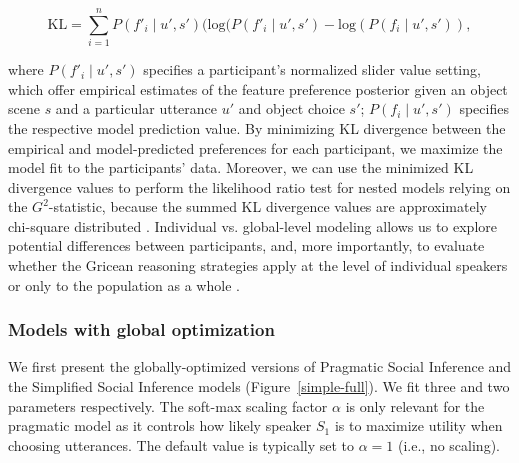 \documentclass[10pt,a4paper]{article}
\begin{document}
$$\textrm{KL} = \sum_{i=1}^{n} P(f'_i\mid u',s') (\textrm {log} (P(f'_i\mid u',s') - \textrm {log} (P(f_i\mid u',s')),$$

where $P(f'_i\mid u',s')$ specifies a participant's normalized slider value setting, which offer empirical estimates of the feature preference posterior given an object scene $s$ and a particular utterance $u'$ and object choice $s'$;
$P(f_i\mid u',s')$ specifies the respective model prediction value. 
By minimizing KL divergence between the empirical and model-predicted preferences for each participant, we maximize the model fit to the participants' data. 
Moreover, we can use the minimized KL divergence values to perform the likelihood ratio test for nested models relying on the $G^2$-statistic, because the summed KL divergence values are approximately chi-square distributed \cite{Lewandowsky:2011}. 
Individual vs. global-level modeling allows us to explore potential differences between participants, and, more importantly, to evaluate whether the Gricean reasoning strategies apply at the level of individual speakers or only to the population as a whole \cite{franke2016reasoning}. 


\subsubsection{Models with global optimization}

We first present the globally-optimized versions of Pragmatic Social Inference and the Simplified Social Inference models (Figure~\ref{simple-full}).
We fit three and two parameters respectively.
The soft-max scaling factor $\alpha$ is only relevant for the pragmatic model as it  controls how likely speaker $S_1$ is to maximize utility when choosing utterances. 
The default value is typically set to $\alpha=1$ (i.e., no scaling). 
\end{document}
